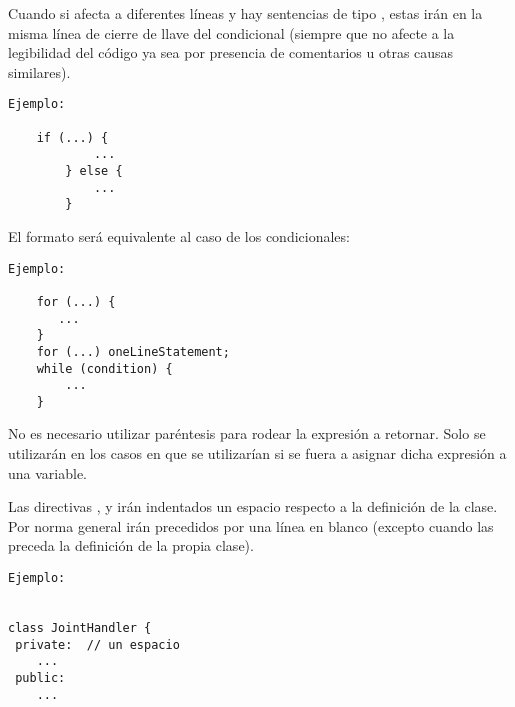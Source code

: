     Cuando si afecta a diferentes líneas y hay sentencias de tipo , estas irán en la misma línea de cierre de llave del condicional (siempre que no afecte a la legibilidad del código ya sea por presencia de comentarios u otras causas similares).
    \\ 

    \lstset{language=C, breaklines=true, basicstyle=\footnotesize}
    \begin{lstlisting}[frame=single]
Ejemplo: 

    if (...) {
            ...
        } else {
            ...
        }

    \end{lstlisting}
    

El formato será equivalente al caso de los condicionales:
\\ 

    \lstset{language=C, breaklines=true, basicstyle=\footnotesize}
    \begin{lstlisting}[frame=single]
Ejemplo: 

    for (...) {
       ...
    }
    for (...) oneLineStatement;
    while (condition) {
        ...
    }

    \end{lstlisting}  
    
    

No es necesario utilizar paréntesis para rodear la expresión a retornar. Solo se utilizarán en los casos en que se utilizarían si se fuera a asignar dicha expresión a una variable.


Las directivas ,  y  irán indentados un espacio respecto a la definición de la clase. Por norma general irán precedidos por una línea en blanco (excepto cuando las preceda la definición de la propia clase).
\\ 

    \lstset{language=C, breaklines=true, basicstyle=\footnotesize}
    \begin{lstlisting}[frame=single]
Ejemplo: 


class JointHandler {
 private:  // un espacio
    ...
 public:
    ...

    \end{lstlisting} 
    
